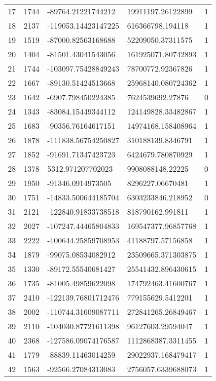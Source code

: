 \begin{longtable}{lllll}
    17 & 1744 & -89764.21221744212 & 19911197.26122899 & 1 \\
    18 & 2137 & -119053.14423147225 & 616366798.194118 & 1 \\
    19 & 1519 & -87000.82563168688 & 52209050.37311575 & 1 \\
    20 & 1404 & -81501.43041543056 & 161925071.80742893 & 1 \\
    21 & 1744 & -103097.75428849243 & 78700772.92367826 & 1 \\
    22 & 1667 & -89130.51424513668 & 25968140.080724362 & 1 \\
    23 & 1642 & -6907.798450224385 & 7624539692.27876 & 0 \\
    24 & 1343 & -83084.15449344112 & 124149828.33482867 & 1 \\
    25 & 1683 & -90356.76164617151 & 14974168.158408964 & 1 \\
    26 & 1878 & -111838.56754250827 & 310188139.8346791 & 1 \\
    27 & 1852 & -91691.71347423723 & 6424679.780870929 & 1 \\
    28 & 1378 & 5312.971207702023 & 9908088148.22225 & 0 \\
    29 & 1950 & -91346.0914973505 & 8296227.06670481 & 1 \\
    30 & 1751 & -14833.500644185704 & 6303233846.218952 & 0 \\
    31 & 2121 & -122840.91833738518 & 818790162.991811 & 1 \\
    32 & 2027 & -107247.44465804833 & 169547377.96857768 & 1 \\
    33 & 2222 & -100644.25859708953 & 41188797.57156858 & 1 \\
    34 & 1879 & -99075.08534082912 & 23509665.371303875 & 1 \\
    35 & 1330 & -89172.55540681427 & 25541432.896430615 & 1 \\
    36 & 1735 & -81005.49859622098 & 174792463.41600767 & 1 \\
    37 & 2410 & -122139.76801712476 & 779155629.5412201 & 1 \\
    38 & 2002 & -110744.31609087711 & 272841265.26849467 & 1 \\
    39 & 2110 & -104030.87721611398 & 96127603.29594047 & 1 \\
    40 & 2368 & -127586.09074176587 & 1112868387.3311455 & 1 \\
    41 & 1779 & -88839.11463014259 & 29022937.168479417 & 1 \\
    42 & 1563 & -92566.27084313083 & 2756057.6339688073 & 1 \\

\end{longtable}
